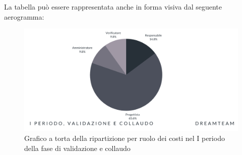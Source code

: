La tabella può essere rappresentata anche in forma visiva dal seguente aerogramma:
\begin{figure}[!h]
\centering
\includegraphics[scale=0.65]{Sezioni/SezioniPreventivo/grafici/Validazione_I_periodo_costi.png}
\caption{Grafico a torta della ripartizione per ruolo dei costi nel I periodo della fase di validazione e collaudo}
\end{figure}



